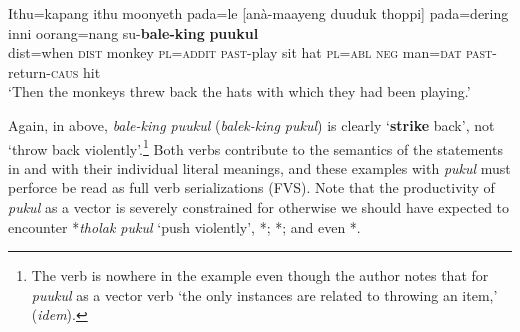 \ea\label{jaffar:ex:71}
\gll Ithu=kapang ithu moonyeth pada=le [anà-maayeng duuduk thoppi] pada=dering inni oorang=nang su-\textbf{bale-king} \textbf{puukul} \\
 dist=when \textsc{dist} monkey \textsc{pl}=\textsc{addit} \textsc{past}-play sit hat \textsc{pl}=\textsc{abl}  \textsc{neg} man=\textsc{dat}  \textsc{past}-return-\textsc{caus} hit\\
 `Then the monkeys threw back the hats with which they had been playing.'
\z

Again, in  above, \textit{bale-king puukul} (\textit{balek-king pukul}) is clearly `\textbf{strike} back', not `throw back violently'.\footnote{The 
 verb  is nowhere in the example even though the author notes that for \textit{puukul} as a vector verb `the only instances are related to throwing an item,' (\textit{idem}).
}
Both verbs contribute to the semantics of the statements in  and  with their individual literal meanings, and these examples with \textit{pukul} must perforce be read as full verb serializations (FVS). Note that the productivity of \textit{pukul} as a vector is severely constrained for otherwise we should have expected to encounter *\textit{tholak pukul} `push violently', *; *; and even *. 

